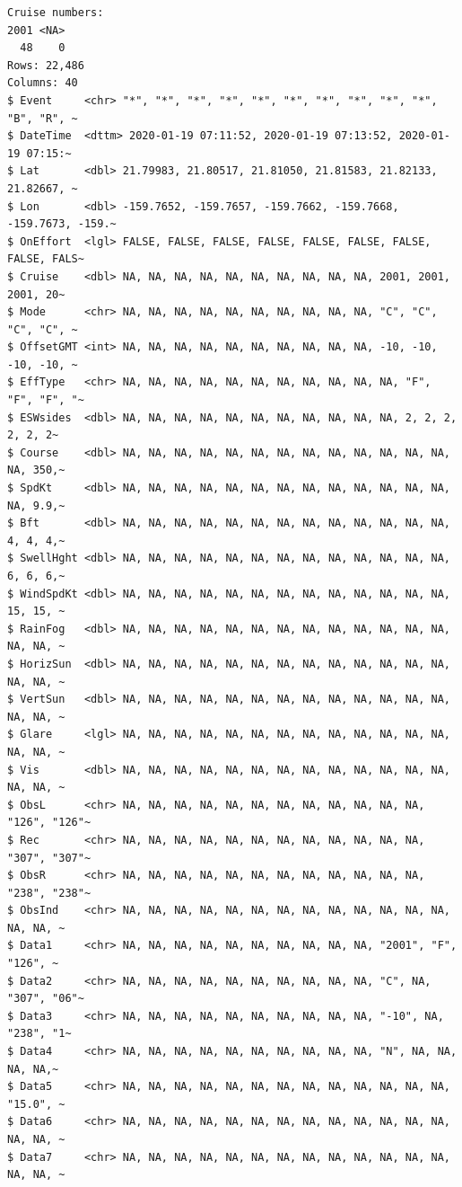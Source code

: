 \documentclass[
]{book}
\begin{document}
\begin{verbatim}
Cruise numbers: 
2001 <NA> 
  48    0 
Rows: 22,486
Columns: 40
$ Event     <chr> "*", "*", "*", "*", "*", "*", "*", "*", "*", "*", "B", "R", ~
$ DateTime  <dttm> 2020-01-19 07:11:52, 2020-01-19 07:13:52, 2020-01-19 07:15:~
$ Lat       <dbl> 21.79983, 21.80517, 21.81050, 21.81583, 21.82133, 21.82667, ~
$ Lon       <dbl> -159.7652, -159.7657, -159.7662, -159.7668, -159.7673, -159.~
$ OnEffort  <lgl> FALSE, FALSE, FALSE, FALSE, FALSE, FALSE, FALSE, FALSE, FALS~
$ Cruise    <dbl> NA, NA, NA, NA, NA, NA, NA, NA, NA, NA, 2001, 2001, 2001, 20~
$ Mode      <chr> NA, NA, NA, NA, NA, NA, NA, NA, NA, NA, "C", "C", "C", "C", ~
$ OffsetGMT <int> NA, NA, NA, NA, NA, NA, NA, NA, NA, NA, -10, -10, -10, -10, ~
$ EffType   <chr> NA, NA, NA, NA, NA, NA, NA, NA, NA, NA, NA, "F", "F", "F", "~
$ ESWsides  <dbl> NA, NA, NA, NA, NA, NA, NA, NA, NA, NA, NA, 2, 2, 2, 2, 2, 2~
$ Course    <dbl> NA, NA, NA, NA, NA, NA, NA, NA, NA, NA, NA, NA, NA, NA, 350,~
$ SpdKt     <dbl> NA, NA, NA, NA, NA, NA, NA, NA, NA, NA, NA, NA, NA, NA, 9.9,~
$ Bft       <dbl> NA, NA, NA, NA, NA, NA, NA, NA, NA, NA, NA, NA, NA, 4, 4, 4,~
$ SwellHght <dbl> NA, NA, NA, NA, NA, NA, NA, NA, NA, NA, NA, NA, NA, 6, 6, 6,~
$ WindSpdKt <dbl> NA, NA, NA, NA, NA, NA, NA, NA, NA, NA, NA, NA, NA, 15, 15, ~
$ RainFog   <dbl> NA, NA, NA, NA, NA, NA, NA, NA, NA, NA, NA, NA, NA, NA, NA, ~
$ HorizSun  <dbl> NA, NA, NA, NA, NA, NA, NA, NA, NA, NA, NA, NA, NA, NA, NA, ~
$ VertSun   <dbl> NA, NA, NA, NA, NA, NA, NA, NA, NA, NA, NA, NA, NA, NA, NA, ~
$ Glare     <lgl> NA, NA, NA, NA, NA, NA, NA, NA, NA, NA, NA, NA, NA, NA, NA, ~
$ Vis       <dbl> NA, NA, NA, NA, NA, NA, NA, NA, NA, NA, NA, NA, NA, NA, NA, ~
$ ObsL      <chr> NA, NA, NA, NA, NA, NA, NA, NA, NA, NA, NA, NA, "126", "126"~
$ Rec       <chr> NA, NA, NA, NA, NA, NA, NA, NA, NA, NA, NA, NA, "307", "307"~
$ ObsR      <chr> NA, NA, NA, NA, NA, NA, NA, NA, NA, NA, NA, NA, "238", "238"~
$ ObsInd    <chr> NA, NA, NA, NA, NA, NA, NA, NA, NA, NA, NA, NA, NA, NA, NA, ~
$ Data1     <chr> NA, NA, NA, NA, NA, NA, NA, NA, NA, NA, "2001", "F", "126", ~
$ Data2     <chr> NA, NA, NA, NA, NA, NA, NA, NA, NA, NA, "C", NA, "307", "06"~
$ Data3     <chr> NA, NA, NA, NA, NA, NA, NA, NA, NA, NA, "-10", NA, "238", "1~
$ Data4     <chr> NA, NA, NA, NA, NA, NA, NA, NA, NA, NA, "N", NA, NA, NA, NA,~
$ Data5     <chr> NA, NA, NA, NA, NA, NA, NA, NA, NA, NA, NA, NA, NA, "15.0", ~
$ Data6     <chr> NA, NA, NA, NA, NA, NA, NA, NA, NA, NA, NA, NA, NA, NA, NA, ~
$ Data7     <chr> NA, NA, NA, NA, NA, NA, NA, NA, NA, NA, NA, NA, NA, NA, NA, ~

\end{verbatim}
\end{document}
